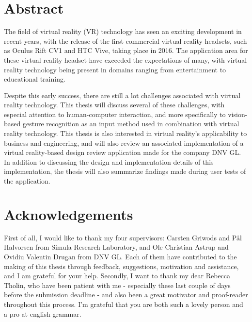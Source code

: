\chapter*{Abstract}                    

The field of virtual reality (VR) technology has seen an exciting development in recent years, 
with the release of the first commercial virtual reality headsets, such as Oculus Rift CV1 and HTC Vive, taking place in 2016.
The application area for these virtual reality headset have exceeded the expectations of many, with virtual reality 
technology being present in domains ranging from entertainment to educational training.

Despite this early success, there are still a lot challenges associated with virtual reality technology. This thesis will discuss several of these challenges, 
with especial attention to human-computer interaction, and more specifically to vision-based gesture recognition as an input method used in combination with virtual reality technology. 
This thesis is also interested in virtual reality's applicability to business and engineering, and will also review an associated implementation of a virtual reality-based 
design review application made for the company DNV GL. In addition to discussing the design and implementation details of this implementation, the thesis will also summarize 
findings made during user tests of the application. 

\chapter*{Acknowledgements}  
First of all, I would like to thank my four supervisors: Carsten Griwods and Pål Halvorsen from Simula Research Laboratory, and Ole Christian Astrup and Ovidiu Valentin Drugan 
from DNV GL. Each of them have contributed to the making of this thesis through feedback, suggestions, motivation and assistance, and I am grateful for your help.
Secondly, I want to thank my dear Rebecca Tholin, who have been patient with me - especially these last couple of days before the submission deadline - and also
been a great motivator and proof-reader throughout this process. I'm grateful that you are both such a lovely person and a pro at english grammar.

